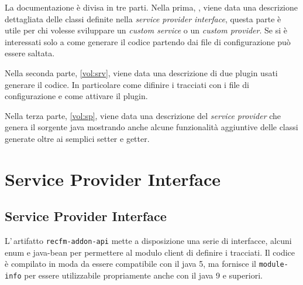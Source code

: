 \documentclass[a4paper,10pt]{report}
\begin{document}
La documentazione è divisa in tre parti. Nella prima, \ref{vol:spi}, viene data 
una descrizione dettagliata delle classi definite nella 
\textsl{service provider interface}, questa parte è utile per chi volesse 
sviluppare un \textit{custom service} o un \textit{custom provider}. 
Se si è interessati solo a come generare il codice partendo dai file di 
configurazione può essere saltata.

Nella seconda parte, \ref{vol:srv}, viene data una descrizione di due plugin 
usati generare il codice.
In particolare come difinire i tracciati con i file di configurazione e come 
attivare il plugin.

Nella terza parte, \ref{vol:sp}, viene data una descrizione del \textsl{service 
provider} che genera il sorgente java mostrando anche alcune funzionalità 
aggiuntive delle classi generate oltre ai semplici setter e getter.


%

\clearpage

\tableofcontents

\clearpage

\part{Service Provider Interface}\label{vol:spi}

%                                           

\chapter{Service Provider Interface}
L'\,artifatto \verb!recfm-addon-api! mette a disposizione una serie di 
interfacce, alcuni enum e java-bean per permettere al modulo client di definire
i tracciati. 
Il codice è compilato in moda da essere compatibile con il java 5, ma fornisce
il \verb!module-info! per essere utilizzabile propriamente anche con il java 9
e superiori.
\end{document}
